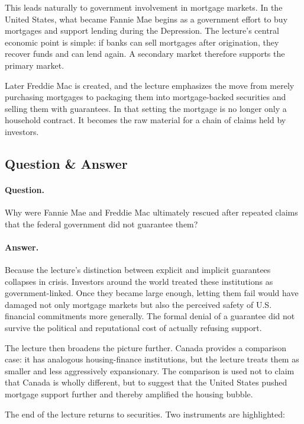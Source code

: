 This leads naturally to government involvement in mortgage markets. In the United States, what became Fannie Mae begins as a government effort to buy mortgages and support lending during the Depression. The lecture's central economic point is simple: if banks can sell mortgages after origination, they recover funds and can lend again. A secondary market therefore supports the primary market.

Later Freddie Mac is created, and the lecture emphasizes the move from merely purchasing mortgages to packaging them into mortgage-backed securities and selling them with guarantees. In that setting the mortgage is no longer only a household contract. It becomes the raw material for a chain of claims held by investors.

\subsection{Question \& Answer}

\paragraph{Question.} Why were Fannie Mae and Freddie Mac ultimately rescued after repeated claims that the federal government did not guarantee them?

\paragraph{Answer.} Because the lecture's distinction between explicit and implicit guarantees collapses in crisis. Investors around the world treated these institutions as government-linked. Once they became large enough, letting them fail would have damaged not only mortgage markets but also the perceived safety of U.S. financial commitments more generally. The formal denial of a guarantee did not survive the political and reputational cost of actually refusing support.

The lecture then broadens the picture further. Canada provides a comparison case: it has analogous housing-finance institutions, but the lecture treats them as smaller and less aggressively expansionary. The comparison is used not to claim that Canada is wholly different, but to suggest that the United States pushed mortgage support further and thereby amplified the housing bubble.

The end of the lecture returns to securities. Two instruments are highlighted:

